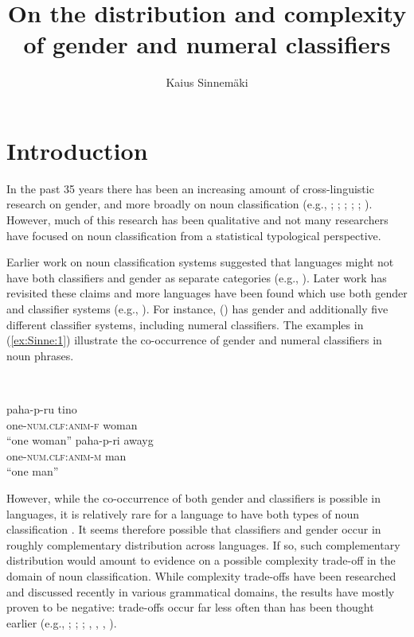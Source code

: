 \documentclass[output=collectionpaper]{langsci/langscibook}
\title{On the distribution and complexity of gender and numeral classifiers}
\author{%
Kaius Sinnemäki
\affiliation{%
University of Helsinki}
}%
\begin{document}
\section{Introduction}

In the past 35 years there has been an increasing amount of cross-linguistic research on gender, and more broadly on noun classification (e.g., \citealt{Dixon1982}; \citealt{Corbett1991}; \citealt{Aikhenvald2000}; \citealt{Audring2009}; \citealt{Kilarski2013}; \citealt{DiGarbo2014}). However, much of this research has been qualitative and not many researchers have focused on noun classification from a statistical typological perspective.

Earlier work on noun classification systems suggested that languages might not have both classifiers and gender as separate categories (e.g., \citealt{Dixon1982}). Later work has revisited these claims and more languages have been found which use both gender and classifier systems (e.g., \citealt{Aikhenvald2000}). For instance,  () has gender and additionally five different classifier systems, including numeral classifiers. The examples in (\ref{ex:Sinne:1}) illustrate the co-occurrence of gender and numeral classifiers in noun phrases.

\ea
\label{ex:Sinne:1}
\\
\begin{xlist}
\ex
\gll paha-p-ru tino\\
one-\textsc{num.clf:anim-f} woman\\
\glt ``one woman''
\ex
\gll paha-p-ri awayg\\
one-\textsc{num.clf:anim-m} man \\
\glt ``one man''\\
\end{xlist}
\z

However, while the co-occurrence of both gender and classifiers is possible in languages, it is relatively rare for a language to have both types of noun classification \citep{Corbett2013}. It seems therefore possible that classifiers and gender occur in roughly complementary distribution across languages. If so, such complementary distribution would amount to evidence on a possible complexity trade-off in the domain of noun classification. While complexity trade-offs have been researched and discussed recently in various grammatical domains, the results have mostly proven to be negative: trade-offs occur far less often than has been thought earlier (e.g., \citealt{Shosted2006}; \citealt{Miestamo2009}; \citealt{Nichols2009}; \citealt{Sinnemaeki2008}, \citealt*{Sinnemaeki2011}, \citealt*{Sinnemaeki2014b}, \citealt*{Sinnemaeki2014a}).
\end{document}
